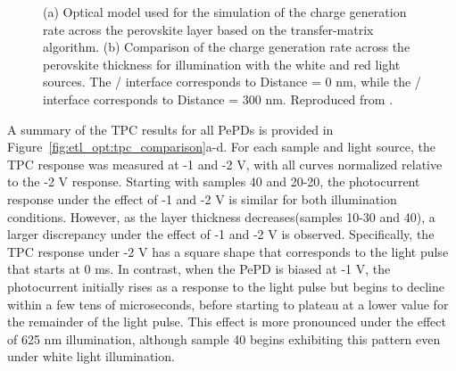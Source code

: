 \begin{figure}[ht!]
\begin{subfigure}[t]{0.4\textwidth}
        \caption{}
        \label{}
    \end{subfigure}
    \caption[Optical model for transfer-matrix algorithm simulations and simulated charge generation rate profiles.]{(a) Optical model used for the simulation of the charge generation rate across the perovskite layer based on the transfer-matrix algorithm. (b) Comparison of the charge generation rate across the perovskite thickness for illumination with the white and red light sources. The / interface corresponds to Distance = 0 nm, while the / interface corresponds to Distance = 300 nm. Reproduced from \cite{Papadopoulou2025ElectronSpeed}.}
    \label{fig:etl_opt:tpc_simulation}
\end{figure}


A summary of the TPC results for all PePDs is provided in Figure~\ref{fig:etl_opt:tpc_comparison}a-d. For each sample and light source, the TPC response was measured at -1 and -2 V, with all curves normalized relative to the -2 V response. Starting with samples 40 and 20-20, the photocurrent response under the effect of -1 and -2 V is similar for both illumination conditions. However, as the  layer thickness decreases(samples 10-30 and 40), a larger discrepancy under the effect of -1 and -2 V is observed. Specifically, the TPC response under -2 V has a square shape that corresponds to the light pulse that starts at 0 ms. In contrast, when the PePD is biased at -1 V, the photocurrent initially rises as a response to the light pulse but begins to decline within a few tens of microseconds, before starting to plateau at a lower value for the remainder of the light pulse. This effect is more pronounced under the effect of 625 nm illumination, although sample 40 begins exhibiting this pattern even under white light illumination.


